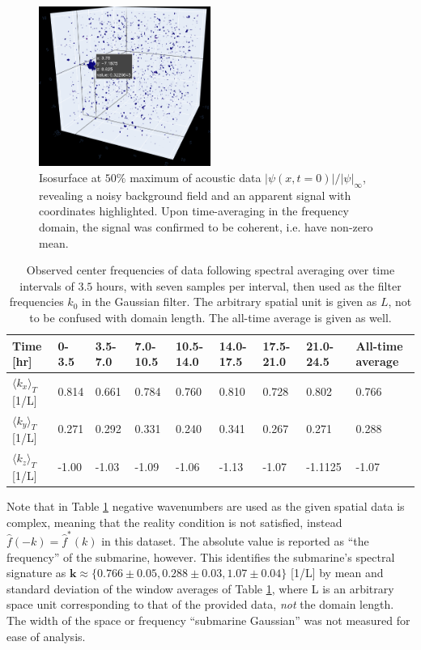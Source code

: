 \documentclass{article}
\begin{document}
\begin{figure}[ht]
  \centering
  \includegraphics[width=0.5\textwidth]{pics/iso}
  \caption{Isosurface at $50\%$ maximum of acoustic data $|\psi(x,t=0)|/|\psi|_\infty$, revealing a noisy background field and an apparent signal with coordinates highlighted. Upon time-averaging in the frequency domain, the signal was confirmed to be coherent, i.e. have non-zero mean.}\label{iso}
\end{figure}

\begin{table}[b]
  \centering
  \begin{tabular}{|l|l|l|l|l|l|l|l|l|}
    \hline
    Time {[}hr{]}   & 0-3.5 & 3.5-7.0 & 7.0-10.5 & 10.5-14.0 & 14.0-17.5 & 17.5-21.0 & 21.0-24.5 & All-time average \\ \hline
    $\langle k_x\rangle_T$ {[}1/L{]} & 0.814 & 0.661   & 0.784    & 0.760     & 0.810     & 0.728     & 0.802     & 0.766            \\ \hline
    $\langle k_y\rangle_T$ {[}1/L{]} & 0.271 & 0.292   & 0.331    & 0.240     & 0.341     & 0.267     & 0.271     & 0.288            \\ \hline
    $\langle k_z\rangle_T$ {[}1/L{]} & -1.00 & -1.03   & -1.09    & -1.06     & -1.13     & -1.07     & -1.1125   & -1.07            \\ \hline
  \end{tabular}
  \caption{Observed center frequencies of data following spectral averaging over time intervals of $3.5$ hours, with seven samples per interval, then used as the filter frequencies $k_0$ in the Gaussian filter. The arbitrary spatial unit is given as $L$, not to be confused with domain length. The all-time average is given as well.}\label{frequencies}
\end{table}

Note that in Table \ref{frequencies} negative wavenumbers are used as the given spatial data is complex, meaning that the reality condition is not satisfied, instead $\hat{f}(-k) = \hat{f}^*(k)$ in this dataset. The absolute value is reported as ``the frequency'' of the submarine, however. This identifies the submarine's spectral signature as $\bm{k} \approx \{0.766 \pm 0.05, 0.288 \pm 0.03, 1.07 \pm 0.04 \}$ {[}1/L{]} by mean and standard deviation of the window averages of Table \ref{frequencies}, where L is an arbitrary space unit corresponding to that of the provided data, \textit{not} the domain length. The width of the space or frequency ``submarine Gaussian'' was not measured for ease of analysis.
\end{document}
